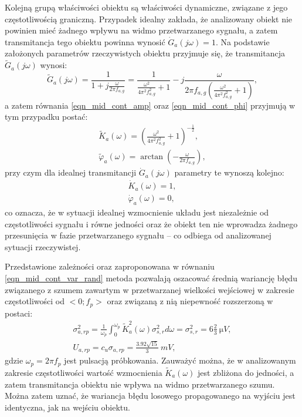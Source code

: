 Kolejną grupą właściwości obiektu są właściwości dynamiczne, związane z jego częstotliwością graniczną. Przypadek idealny zakłada, że analizowany obiekt nie powinien mieć żadnego wpływu na widmo przetwarzanego sygnału, a zatem transmitancja tego obiektu powinna wynosić $\dot{G}_{a}(j\omega) = 1$. Na podstawie założonych parametrów rzeczywistych obiektu przyjmuje się, że transmitancja $\tilde{G}_{a}(j\omega)$ wynosi:
\begin{equation}
\tilde{G}_{a} \left( j\omega \right) = \frac{1}{1 + j \frac{\omega}{2 \pi f_{a,g}}} = \frac{1}{\frac{\omega^{2}}{4 \pi^{2} f_{a,g}^{2}} + 1} - j \frac{\omega}{2 \pi f_{a,g} \left( \frac{\omega^{2}}{4 \pi^{2} f_{a,g}^{2}} + 1 \right) } \label{eqn_sym_parta_trans},
\end{equation}
a zatem równania \eqref{eqn_mid_cont_amp} oraz \eqref{eqn_mid_cont_phi} przyjmują w tym przypadku postać:
\begin{gather}
\tilde{K}_{a} \left( \omega \right) = \left( \frac{\omega^{2}}{4 \pi^{2} f_{a,g}^{2}} + 1 \right)^{-\frac{1}{2}} \label{eqn_sym_parta_amp_real}, \\
\tilde{\varphi}_{a} \left( \omega \right) = \arctan \left( -\frac{\omega}{2 \pi f_{a,g}} \right) \label{eqn_sym_parta_phi_real},
\end{gather}
przy czym dla idealnej transmitancji $\dot{G}_{a}(j\omega)$ parametry te wynoszą kolejno:
\begin{gather}
\dot{K}_{a} \left( \omega \right) = 1 \label{eqn_sym_parta_amp_ideal}, \\
\dot{\varphi}_{a} \left( \omega \right) = 0 \label{eqn_sym_parta_phi_ideal},
\end{gather}
co oznacza, że w sytuacji idealnej wzmocnienie układu jest niezależnie od częstotliwości sygnału i równe jedności oraz że obiekt ten nie wprowadza żadnego przesunięcia w fazie przetwarzanego sygnału -- co odbiega od analizowanej sytuacji rzeczywistej.

Przedstawione zależności oraz zaproponowana w równaniu \eqref{eqn_mid_cont_var_rand} metoda pozwalają oszacować średnią wariancję błędu związanego z szumem zawartym w przetwarzanej wielkości wejściowej w zakresie częstotliwości od $<0;f_{p}>$ oraz związaną z nią niepewność rozszerzoną w postaci:
\begin{gather}
\sigma_{a,rp}^{2} = \frac{1}{\omega_{p}} \int _{0} ^{\omega_{p}} \tilde{K}_{a}^{2} \left( \omega \right) \sigma_{s,r}^{2} d\omega = \sigma_{s,r}^{2} = 6 \frac{2}{3} ~\unit{\micro V} \label{eqn_sym_parta_rand_prop_var}, \\
U_{a,rp} = c_{u} \sigma_{a,rp} = \frac{3.92 \sqrt{15}}{3} ~\unit{mV} \label{eqn_sym_parta_rand_prop_unc},
\end{gather}
gdzie $\omega_{p} = 2 \pi f_{p}$ jest pulsacją próbkowania. Zauważyć można, że w analizowanym zakresie częstotliwości wartość wzmocnienia $\tilde{K}_{a}(\omega)$ jest zbliżona do jedności, a zatem transmitancja obiektu nie wpływa na widmo przetwarzanego szumu. Można zatem uznać, że wariancja błędu losowego propagowanego na wyjściu jest identyczna, jak na wejściu obiektu.

